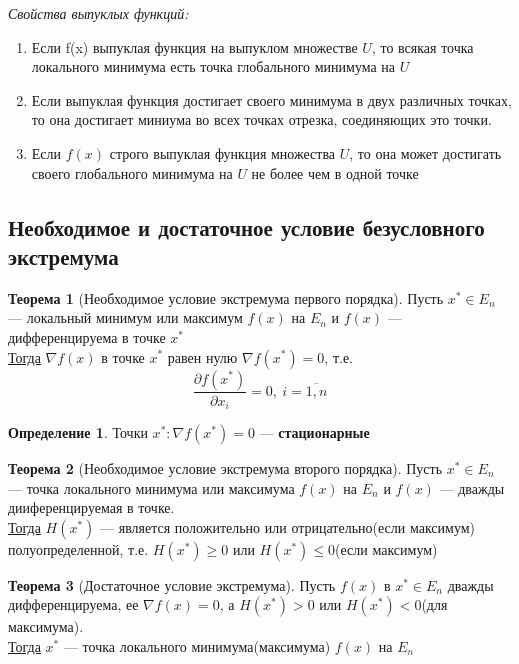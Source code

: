 \documentclass[oneside]{book}
\theoremstyle{plain}
\theoremstyle{remark}
\theoremstyle{definition}
\newtheorem{theorem}{Теорема}[section]
\newtheorem*{definition}{Определение}
\begin{document}
\emph{Свойства выпуклых функций:}
\begin{enumerate}
\item Если f(x) выпуклая функция на выпуклом множестве \(U\), то всякая точка локального минимума есть точка глобального минимума на \(U\)
\item Если выпуклая функция достигает своего минимума в двух различных точках, то она достигает миниума во всех точках отрезка, соединяющих это точки.
\item Если \(f(x)\) строго выпуклая функция множества \(U\), то она может достигать своего глобального минимума на \(U\) не более чем в одной точке
\end{enumerate}
\subsection{Необходимое и достаточное условие безусловного экстремума}
\label{sec:org83c3e03}
\begin{theorem}[Необходимое условие экстремума первого порядка]
Пусть \(x^* \in E_n\) --- локальный минимум или максимум \(f(x)\) на \(E_n\) и \(f(x)\) --- дифференцируема в точке \(x^*\) \\
\uline{Тогда} \(\nabla f(x)\) в точке \(x^*\) равен нулю \(\nabla f(x^*) = 0\), т.е.
\[ \frac{\partial f(x^*)}{\partial x_i} = 0,\ i = \overline{1, n} \]
\end{theorem}
\begin{definition}
Точки \(x^*: \nabla f(x^*) = 0\) --- \textbf{стационарные}
\end{definition}
\begin{theorem}[Необходимое условие экстремума второго порядка]
Пусть \(x^* \in E_n\) --- точка локального минимума или максимума \(f(x)\) на \(E_n\) и \(f(x)\) --- дважды дииференцируемая в точке. \\
\uline{Тогда} \(H(x^*)\) --- является положительно или отрицательно(если максимум) полуопределенной, т.е. \(H(x^*) \ge 0\) или \(H(x^*) \le 0\)(если максимум)
\end{theorem}
\begin{theorem}[Достаточное условие экстремума]
Пусть \(f(x)\) в \(x^* \in E_n\) дважды дифференцируема, ее \(\nabla f(x) = 0\), а \(H(x^*) > 0\) или \(H(x^*) < 0\)(для максимума). \\
\uline{Тогда} \(x^*\) --- точка локального минимума(максимума) \(f(x)\) на \(E_n\)
\end{theorem}
\end{document}
